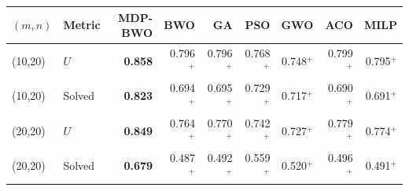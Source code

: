 \begin{tabular}{llrrrrrrr}\toprule
$(m,n)$ & Metric & MDP-BWO & BWO & GA & PSO & GWO & ACO & MILP\\\midrule
(10,20) & $U$ & \textbf{0.858} & 0.796$^{+}$ & 0.796$^{+}$ & 0.768$^{+}$ & 0.748$^{+}$ & 0.799$^{+}$ & 0.795$^{+}$\\
(10,20) & Solved & \textbf{0.823} & 0.694$^{+}$ & 0.695$^{+}$ & 0.729$^{+}$ & 0.717$^{+}$ & 0.690$^{+}$ & 0.691$^{+}$\\
(20,20) & $U$ & \textbf{0.849} & 0.764$^{+}$ & 0.770$^{+}$ & 0.742$^{+}$ & 0.727$^{+}$ & 0.779$^{+}$ & 0.774$^{+}$\\
(20,20) & Solved & \textbf{0.679} & 0.487$^{+}$ & 0.492$^{+}$ & 0.559$^{+}$ & 0.520$^{+}$ & 0.496$^{+}$ & 0.491$^{+}$\\
\bottomrule
\end{tabular}